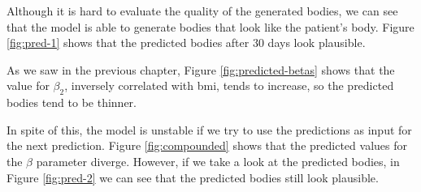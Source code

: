 Although it is hard to evaluate the quality of the generated bodies, we can see
that the model is able to generate bodies that look like the patient's body.
Figure {\ref{fig:pred-1}} shows that the predicted bodies after 30 days look
plausible.

As we saw in the previous chapter, Figure \ref{fig:predicted-betas} shows that
the value for $\beta_2$, inversely correlated with \gls{bmi}, tends to
increase, so the predicted bodies tend to be thinner.

In spite of this, the model is unstable if we try to use the predictions as
input for the next prediction. Figure \ref{fig:compounded} shows that the
predicted values for the $\beta$ parameter diverge. However, if we take a look
at the predicted bodies, in Figure {\ref{fig:pred-2}} we can see that the
predicted bodies still look plausible.

